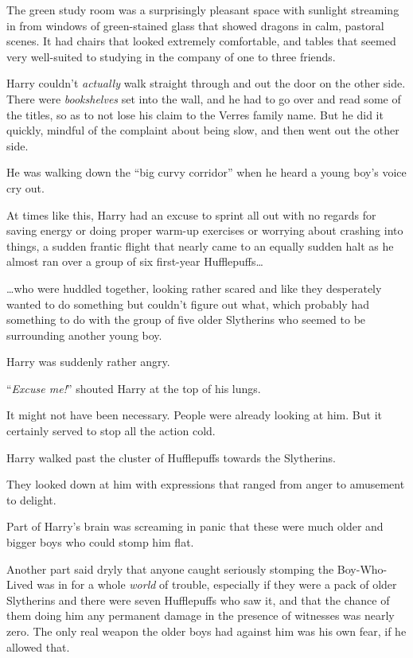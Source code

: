 The green study room was a surprisingly pleasant space with sunlight streaming in from windows of green-stained glass that showed dragons in calm, pastoral scenes. It had chairs that looked extremely comfortable, and tables that seemed very well-suited to studying in the company of one to three friends.

Harry couldn’t \emph{actually} walk straight through and out the door on the other side. There were \emph{bookshelves} set into the wall, and he had to go over and read some of the titles, so as to not lose his claim to the Verres family name. But he did it quickly, mindful of the complaint about being slow, and then went out the other side.

He was walking down the “big curvy corridor” when he heard a young boy’s voice cry out.

At times like this, Harry had an excuse to sprint all out with no regards for saving energy or doing proper warm-up exercises or worrying about crashing into things, a sudden frantic flight that nearly came to an equally sudden halt as he almost ran over a group of six first-year Hufflepuffs…

…who were huddled together, looking rather scared and like they desperately wanted to do something but couldn’t figure out what, which probably had something to do with the group of five older Slytherins who seemed to be surrounding another young boy.

Harry was suddenly rather angry.

“\emph{Excuse me!}” shouted Harry at the top of his lungs.

It might not have been necessary. People were already looking at him. But it certainly served to stop all the action cold.

Harry walked past the cluster of Hufflepuffs towards the Slytherins.

They looked down at him with expressions that ranged from anger to amusement to delight.

Part of Harry’s brain was screaming in panic that these were much older and bigger boys who could stomp him flat.

Another part said dryly that anyone caught seriously stomping the Boy-Who-Lived was in for a whole \emph{world} of trouble, especially if they were a pack of older Slytherins and there were seven Hufflepuffs who saw it, and that the chance of them doing him any permanent damage in the presence of witnesses was nearly zero. The only real weapon the older boys had against him was his own fear, if he allowed that.

